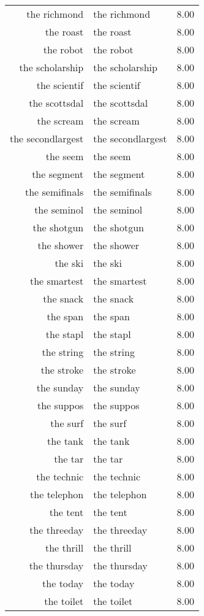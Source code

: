 \begin{table}[ht]
\begin{tabular}{rlr}
  the richmond & the richmond & 8.00 \\ 
  the roast & the roast & 8.00 \\ 
  the robot & the robot & 8.00 \\ 
  the scholarship & the scholarship & 8.00 \\ 
  the scientif & the scientif & 8.00 \\ 
  the scottsdal & the scottsdal & 8.00 \\ 
  the scream & the scream & 8.00 \\ 
  the secondlargest & the secondlargest & 8.00 \\ 
  the seem & the seem & 8.00 \\ 
  the segment & the segment & 8.00 \\ 
  the semifinals & the semifinals & 8.00 \\ 
  the seminol & the seminol & 8.00 \\ 
  the shotgun & the shotgun & 8.00 \\ 
  the shower & the shower & 8.00 \\ 
  the ski & the ski & 8.00 \\ 
  the smartest & the smartest & 8.00 \\ 
  the snack & the snack & 8.00 \\ 
  the span & the span & 8.00 \\ 
  the stapl & the stapl & 8.00 \\ 
  the string & the string & 8.00 \\ 
  the stroke & the stroke & 8.00 \\ 
  the sunday & the sunday & 8.00 \\ 
  the suppos & the suppos & 8.00 \\ 
  the surf & the surf & 8.00 \\ 
  the tank & the tank & 8.00 \\ 
  the tar & the tar & 8.00 \\ 
  the technic & the technic & 8.00 \\ 
  the telephon & the telephon & 8.00 \\ 
  the tent & the tent & 8.00 \\ 
  the threeday & the threeday & 8.00 \\ 
  the thrill & the thrill & 8.00 \\ 
  the thursday & the thursday & 8.00 \\ 
  the today & the today & 8.00 \\ 
  the toilet & the toilet & 8.00 \\ 

\end{tabular}
\end{table}
